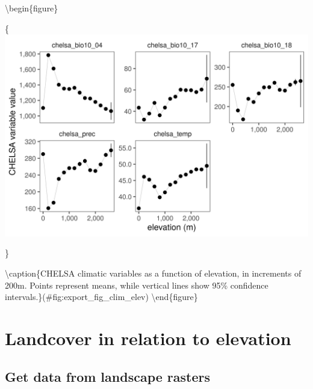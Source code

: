 \documentclass[]{article}
\begin{document}
\textbackslash{}begin\{figure\}

\{\centering \includegraphics[width=\textwidth]{figs/fig_climate_elev}

\}

\textbackslash{}caption\{CHELSA climatic variables as a function of elevation, in increments of 200m. Points represent means, while vertical lines show 95\% confidence intervals.\}(\#fig:export\_fig\_clim\_elev)
\textbackslash{}end\{figure\}

\hypertarget{landcover-in-relation-to-elevation}{%
\section{Landcover in relation to elevation}\label{landcover-in-relation-to-elevation}}

\hypertarget{get-data-from-landscape-rasters}{%
\subsection{Get data from landscape rasters}\label{get-data-from-landscape-rasters}}
\end{document}
